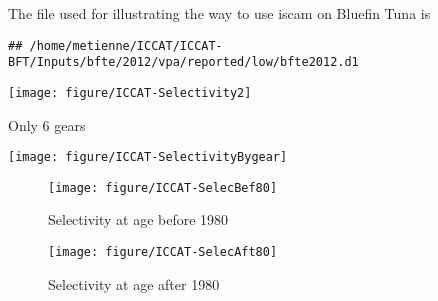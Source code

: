 The file used for illustrating the way to use iscam on Bluefin Tuna is
\begin{verbatim}
## /home/metienne/ICCAT/ICCAT-BFT/Inputs/bfte/2012/vpa/reported/low/bfte2012.d1
\end{verbatim}

{\centering \texttt{[image: figure/ICCAT-Selectivity2]} 

}

Only 6 gears


{\centering \texttt{[image: figure/ICCAT-SelectivityBygear]} 
}




\begin{figure}
{\centering \texttt{[image: figure/ICCAT-SelecBef80]} 

}

\caption[Selectivity at age before 1980]{Selectivity at age before 1980\label{fig:SelecBef80}}
\end{figure}


\begin{figure}
{\centering \texttt{[image: figure/ICCAT-SelecAft80]} 

}
\caption[Selectivity at age after 1980]{Selectivity at age after 1980\label{fig:SelecAft80}}
\end{figure}


